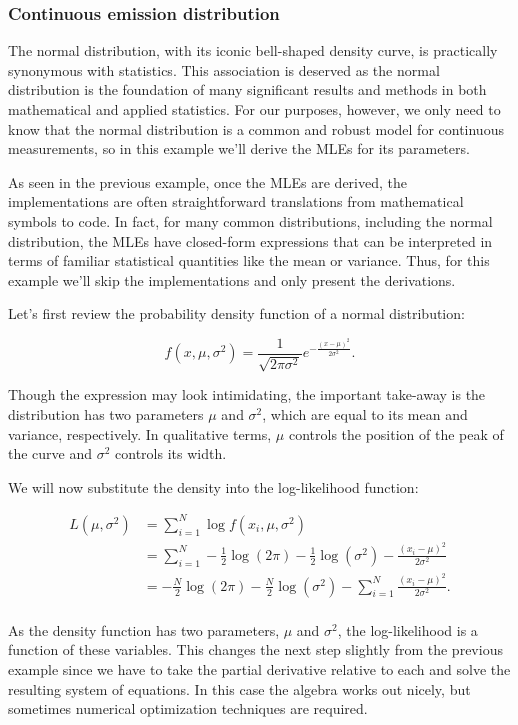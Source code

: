 \subsubsection{Continuous emission distribution}
The normal distribution, with its iconic bell-shaped density curve, is practically synonymous with statistics. This association is deserved as the normal distribution is the foundation of many significant results and methods in both mathematical and applied statistics. For our purposes, however, we only need to know that the normal distribution is a common and robust model for continuous measurements, so in this example we'll derive the MLEs for its parameters.

As seen in the previous example, once the MLEs are derived, the implementations are often straightforward translations from mathematical symbols to code. In fact, for many common distributions, including the normal distribution, the MLEs have closed-form expressions that can be interpreted in terms of familiar statistical quantities like the mean or variance. Thus, for this example we'll skip the implementations and only present the derivations.

Let's first review the probability density function of a normal distribution:

\begin{equation*}
f(x, \mu, \sigma^2) = \frac{1}{\sqrt{2\pi\sigma^2}} e^{-\frac{\left( x-\mu \right)^2}{2\sigma^2}}.
\end{equation*}

Though the expression may look intimidating, the important take-away is the distribution has two parameters $\mu$ and $\sigma^2$, which are equal to its mean and variance, respectively. In qualitative terms, $\mu$ controls the position of the peak of the curve and $\sigma^2$ controls its width.

We will now substitute the density into the log-likelihood function:

\begin{align*}
L(\mu, \sigma^2)
&= \sum_{i=1}^N \log f(x_i, \mu, \sigma^2) \\
&= \sum_{i=1}^N -\frac{1}{2}\log(2\pi) - \frac{1}{2}\log(\sigma^2) - \frac{\left( x_i-\mu \right)^2}{2\sigma^2} \\
&= -\frac{N}{2}\log(2\pi) - \frac{N}{2}\log(\sigma^2) - \sum_{i=1}^N \frac{\left( x_i-\mu \right)^2}{2\sigma^2}. \\
\end{align*}

As the density function has two parameters, $\mu$ and $\sigma^2$, the log-likelihood is a function of these variables. This changes the next step slightly from the previous example since we have to take the partial derivative relative to each and solve the resulting system of equations. In this case the algebra works out nicely, but sometimes numerical optimization techniques are required.

